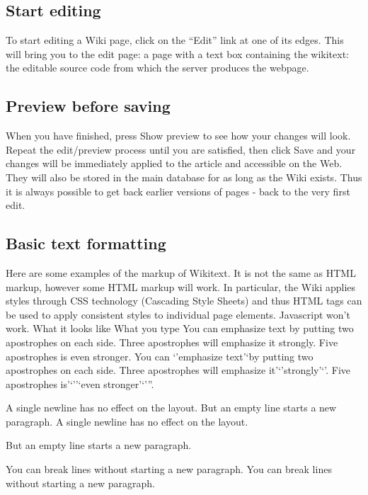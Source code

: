 \documentclass[]{book}
\begin{document}
\subsection{Start editing}\label{start-editing}

To start editing a Wiki page, click on the ``Edit'' link at one of its
edges. This will bring you to the edit page: a page with a text box
containing the wikitext: the editable source code from which the server
produces the webpage.

\subsection{Preview before saving}\label{preview-before-saving}

When you have finished, press Show preview to see how your changes will
look. Repeat the edit/preview process until you are satisfied, then
click Save and your changes will be immediately applied to the article
and accessible on the Web. They will also be stored in the main database
for as long as the Wiki exists. Thus it is always possible to get back
earlier versions of pages - back to the very first edit.

\subsection{Basic text formatting}\label{basic-text-formatting}

Here are some examples of the markup of Wikitext. It is not the same as
HTML markup, however some HTML markup will work. In particular, the Wiki
applies styles through CSS technology (Cascading Style Sheets) and thus
HTML tags can be used to apply consistent styles to individual page
elements. Javascript won't work. What it looks like What you type You
can emphasize text by putting two apostrophes on each side. Three
apostrophes will emphasize it strongly. Five apostrophes is even
stronger. You can `'emphasize text'`by putting two apostrophes on each
side. Three apostrophes will emphasize it'`'strongly'`'. Five
apostrophes is'`''`even stronger'`'''.

A single newline has no effect on the layout. But an empty line starts a
new paragraph. A single newline has no effect on the layout.

But an empty line starts a new paragraph.

You can break lines without starting a new paragraph. You can break
lines without starting a new paragraph.
\end{document}
